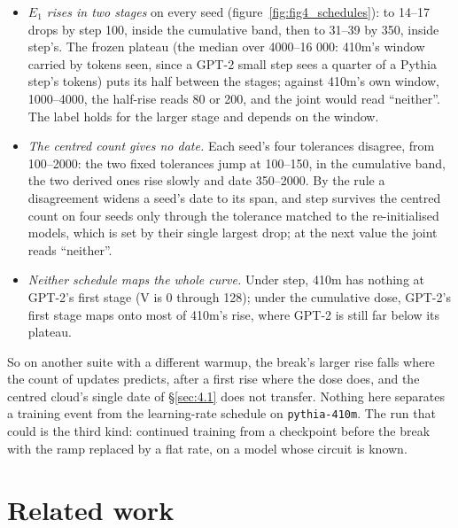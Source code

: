 \documentclass[11pt]{article}
\begin{document}
\begin{itemize}
  \item \emph{$E_{1}$ rises in two stages} on every seed (figure~\ref{fig:fig4_schedules}): to 14--17 drops by step 100, inside the cumulative band, then to 31--39 by 350, inside step's. The frozen plateau (the median over 4000--16 000: 410m's window carried by tokens seen, since a GPT-2 small step sees a quarter of a Pythia step's tokens) puts its half between the stages; against 410m's own window, 1000--4000, the half-rise reads 80 or 200, and the joint would read ``neither''. The label holds for the larger stage and depends on the window.
  \item \emph{The centred count gives no date.} Each seed's four tolerances disagree, from 100--2000: the two fixed tolerances jump at 100--150, in the cumulative band, the two derived ones rise slowly and date 350--2000. By the rule a disagreement widens a seed's date to its span, and step survives the centred count on four seeds only through the tolerance matched to the re-initialised models, which is set by their single largest drop; at the next value the joint reads ``neither''.
  \item \emph{Neither schedule maps the whole curve.} Under step, 410m has nothing at GPT-2's first stage (V is 0 through 128); under the cumulative dose, GPT-2's first stage maps onto most of 410m's rise, where GPT-2 is still far below its plateau.
\end{itemize}

So on another suite with a different warmup, the break's larger rise falls where the count of updates predicts, after a first rise where the dose does, and the centred cloud's single date of \S\ref{sec:4.1} does not transfer. Nothing here separates a training event from the learning-rate schedule on \texttt{pythia-410m}. The run that could is the third kind: continued training from a checkpoint before the break with the ramp replaced by a flat rate, on a model whose circuit is known.

\section{Related work}\label{sec:8}
\end{document}
